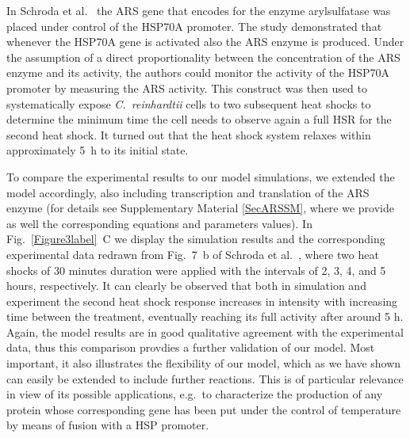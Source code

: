 \documentclass[oneside, 10pt, a4paper, twocolumn]{article}
\begin{document}
In Schroda et al.~\cite{Schroda2000} the ARS gene that encodes for the enzyme arylsulfatase 
was placed under control
of the HSP70A promoter. The study demonstrated that whenever the HSP70A gene is activated also the ARS enzyme is produced.
Under the assumption of a direct proportionality between the concentration of the ARS enzyme and its activity, 
the authors could monitor the activity of the HSP70A promoter by measuring the ARS activity.
This construct was then used to systematically expose \textit{C.~reinhardtii} cells to two
subsequent heat shocks to determine the minimum time
the cell needs to observe again a full HSR for the second heat shock.
It turned out that the heat shock system relaxes within approximately  5~h to its initial state.

To compare the experimental results to our model simulations, we extended the model
accordingly, also including transcription and translation of the ARS enzyme (for details see Supplementary Material \ref{SecARSSM}, where we provide as well the corresponding equations and parameters values). %
In Fig.~\ref{Figure3label}~C we display the simulation results and the corresponding experimental data redrawn from Fig.~7~b of Schroda et al.~\cite{Schroda2000}, where two heat shocks of 30 minutes duration were 
applied with the intervals of 2, 3, 4, and 5 hours, respectively. 
It can clearly be observed that both in simulation and experiment the second heat shock response
increases in intensity with increasing time between the treatment, eventually reaching
its full activity after around 5 h. Again, the model results are in good qualitative 
agreement with the experimental data, thus this comparison provdies a further validation of our model. Most important, it also illustrates the flexibility of our model, which as we have shown can easily be extended to include further reactions. This is of particular relevance in view of its possible applications, e.g.~to characterize the production of any protein whose corresponding gene has been put under the control of temperature by means of fusion with a HSP promoter.
\end{document}
